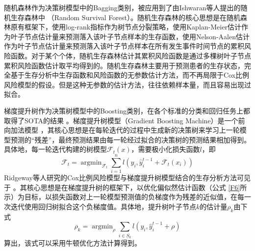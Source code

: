 随机森林作为决策树模型中的Bagging类别，被应用到了由Ishwaran等人提出的随机生存森林中 （Random Survival Forest）。随机生存森林的核心思想是在随机森林原有框架下，使用log-rank指标作为树节点分裂策略，使用Kaplan-Meier估计作为叶子节点估计量来预测落入该叶子节点样本的生存函数，使用Nelson-Aalen估计作为叶子节点估计量来预测落入该叶子节点样本在所有发生事件时间节点的累积风险函数。对于某个个体，随机生存森林估计其累积风险函数是通过多棵树叶子节点累积风险函数估计取平均得到的。随机生存森林主要用于预测患者的生存状态，完全基于生存分析中生存函数和风险函数的无参数估计方法，而不再局限于Cox比例风险模型的假设。但是这种无参数的估计方法，往往依赖样本量，而且容易出现过拟合。

梯度提升树作为决策树模型中的Boosting类别，在各个标准的分类和回归任务上都取得了SOTA的结果 。梯度提升树模型（Gradient Boosting Machine）是一个前向加法模型 ，其核心思想是在每轮迭代的过程中生成新的决策树来学习上一轮模型预测的“残差”，最终预测结果由每一轮经过拟合的决策树的预测结果相加得到。具体地，每一轮迭代构建的树模型$\mathcal{F}_t (x)$，需要极小化损失函数$l$，即
\begin{equation}
\mathcal{F}_t = \mathop{\arg\min}_{\mathcal{F}_t} \sum_{i=1}^n l(y_i, \hat{y}_i^{t-1} + \mathcal{F}_t(x_i)) \label{F9}
\end{equation}
Ridgeway等人研究的Cox比例风险模型与梯度提升树模型结合的生存分析方法可见于 。其核心思想是在梯度提升树的框架下，以优化偏似然估计函数（公式 \eqref{F6}所示）为目标，以损失函数对上一轮模型预测值的负梯度作为残差的近似值，在每一次迭代使用回归树拟合这个负梯度值。具体地，提升树叶子节点$k$的估计量$\rho_k$由下式
\begin{equation}
\rho_k = \mathop{\arg\min}_{\rho} \sum_{i\in S_k} l(y_i, \hat{y}_i^{t-1} + \rho) \label{F10}
\end{equation}算出，该式可以采用牛顿优化方法计算得到。

